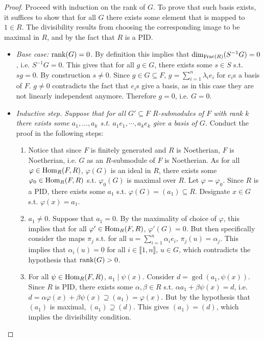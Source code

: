\begin{proof}
    Proceed with induction on the rank of $G$. To prove that such basis exists, it suffices to show that for all $G$ there exists some element that is mapped to $1\in R$. The divisibility results from choosing the corresponding image to be maximal in $R$, and by the fact that $R$ is a PID. 
    \begin{itemize}
        \item \emph{Base case: $\mathrm{rank}(G) = 0$.} By definition this implies that $\dim_{\mathrm{Frac}(R)}(S^{-1}G) = 0$, i.e. $S^{-1}G = 0$. This gives that for all $g\in G$, there exists some $s\in S$ s.t. $sg = 0$. By construction $s\neq 0$. Since $g\in G \subseteq F$, $g = \sum_{i=1}^n \lambda_i e_i$ for $e_i$s a basis of $F$. $g\neq 0$ contradicts the fact that $e_i$s give a basis, as in this case they are not linearly independent anymore. Therefore $g = 0$, i.e. $G = 0$.
        \item \emph{Inductive step. Suppose that for all $G'\subseteq F$ $R$-submodules of $F$ with rank $k$ there exists some $a_1, \ldots, a_k$ s.t. $a_1e_1, \cdots, a_k e_k$ give a basis of $G$.} Conduct the proof in the following steps:
        \begin{enumerate}[label=\arabic*)]
            \item Notice that since $F$ is finitely generated and $R$ is Noetherian, $F$ is Noetherian, i.e. $G$ as an $R$-submodule of $F$ is Noetherian. As for all $\varphi \in \mathrm{Hom}_R(F, R)$, $\varphi(G)$ is an ideal in $R$, there exists some $\varphi_0 \in \mathrm{Hom}_R(F, R)$ s.t. $\varphi_0(G)$ is maximal over $R$. Let $\varphi = \varphi_0$. Since $R$ is a PID, there exists some $a_1$ s.t. $\varphi(G) = (a_1) \subseteq R$. Designate $x\in G$ s.t. $\varphi(x) = a_1$.
            \item $a_1 \neq 0$. Suppose that $a_1 = 0$. By the maximality of choice of $\varphi$, this implies that for all $\varphi' \in \mathrm{Hom}_R(F, R)$, $\varphi'(G) = 0$. But then specifically consider the maps $\pi_j$ s.t. for all $u = \sum_{i=1}^n \alpha_i e_i$, $\pi_j(u) = \alpha_j$. This implies that $\alpha_i(u) = 0$ for all $i\in\llbracket 1, n \rrbracket$, $u\in G$, which contradicts the hypothesis that $\mathrm{rank}(G) > 0$.
            \item For all $\psi \in \mathrm{Hom}_R(F, R)$, $a_1 \mid \psi(x)$. Consider $d = \gcd(a_1, \psi(x))$. Since $R$ is PID, there exists some $\alpha, \beta \in R$ s.t. $\alpha a_1 + \beta \psi(x) = d$, i.e. $d = \alpha \varphi(x) + \beta \psi(x) \supseteq (a_1) = \varphi(x)$. But by the hypothesis that $(a_1)$ is maximal, $(a_1) \supseteq (d)$. This gives $(a_1) = (d)$, which implies the divisibility condition.

\end{enumerate}
\end{itemize}
\end{proof}
